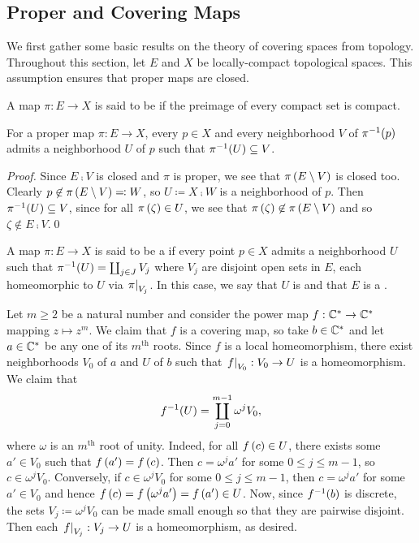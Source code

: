 \documentclass[../Moduli_Spaces_of_Riemann_Surfaces.tex]{subfiles}
\begin{document}
    \subsection{Proper and Covering Maps}
    We first gather some basic results on the theory of covering spaces from topology. Throughout this section, let $E$ and $X$ be locally-compact topological spaces. This assumption ensures that proper maps are closed.
    \begin{definition}
        A map $\pi:E\to X$ is said to be  if the preimage of every compact set is compact.
    \end{definition}
    \begin{proposition}\label{CS:prp:proper_give_neighborhoods}
        For a proper map $\pi:E\to X$, every $p\in X$ and every neighborhood $V$ of $\pi^{-1}\!\left(p\right)$ admits a neighborhood $U$ of $p$ such that $\pi^{-1}\!\left(U\right)\subseteq V$.
    \end{proposition}
    \begin{proof}
        Since $E\comp V$ is closed and $\pi$ is proper, we see that $\pi\left(E\setminus V\right)$ is closed too. Clearly $p\not\in\pi\left(E\setminus V\right)\eqqcolon W$, so $U\coloneqq X\comp W$ is a neighborhood of $p$. Then $\pi^{-1}\!\left(U\right)\subseteq V$, since for all $\pi\left(\zeta\right)\in U$, we see that $\pi\left(\zeta\right)\not\in\pi\left(E\setminus V\right)$ and so $\zeta\not\in E\comp V$.\qed
    \end{proof}
    \begin{definition}
        A map $\pi:E\to X$ is said to be a  if every point $p\in X$ admits a neighborhood $U$ such that $\pi^{-1}\!\left(U\right)=\coprod_{j\in J}V_j$ where $V_j$ are disjoint open sets in $E$, each homeomorphic to $U$ via $\left.\pi\right|_{V_j}$. In this case, we say that $U$ is  and that $E$ is a .
    \end{definition}
    \begin{example}\label{CS:exa:power_map}
        Let $m\geq2$ be a natural number and consider the power map $f:\mathbb{C}^\ast\to\mathbb{C}^\ast$ mapping $z\mapsto z^m$. We claim that $f$ is a covering map, so take $b\in\mathbb{C}^\ast$ and let $a\in\mathbb{C}^\ast$ be any one of its $m^\textrm{th}$ roots. Since $f$ is a local homeomorphism, there exist neighborhoods $V_0$ of $a$ and $U$ of $b$ such that $\left.f\right|_{V_0}:V_0\to U$ is a homeomorphism. We claim that
        \begin{equation*}
            f^{-1}\!\left(U\right)=\coprod_{j=0}^{m-1}\omega^jV_0,
        \end{equation*}
        where $\omega$ is an $m^\textrm{th}$ root of unity. Indeed, for all $f\left(c\right)\in U$, there exists some $a'\in V_0$ such that $f\left(a'\right)=f\left(c\right)$. Then $c=\omega^ja'$ for some $0\leq j\leq m-1$, so $c\in\omega^jV_0$. Conversely, if $c\in\omega^jV_0$ for some $0\leq j\leq m-1$, then $c=\omega^ja'$ for some $a'\in V_0$ and hence $f\left(c\right)=f\left(\omega^ja'\right)=f\left(a'\right)\in U$. Now, since $f^{-1}\!\left(b\right)$ is discrete, the sets $V_j\coloneqq\omega^jV_0$ can be made small enough so that they are pairwise disjoint. Then each $\left.f\right|_{V_j}:V_j\to U$ is a homeomorphism, as desired.\exqed
    \end{example}
\end{document}
